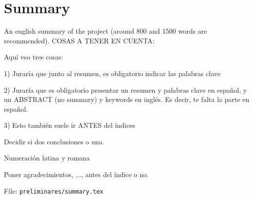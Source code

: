 %

\chapter{Summary}

An english summary of the project (around 800 and 1500 words are recommended).
COSAS A TENER EN CUENTA: 

Aquí veo tres cosas:

1) Juraría que junto al resumen, es obligatorio indicar las palabras clave

2) Juraría que es obligatorio presentar un resumen y palabras clave en español, y un ABSTRACT (no summary) y keywords en inglés. Es decir, te falta la parte en español.

3) Esto también suele ir ANTES del índices

Decidir si dos conclusiones o una.

Numeración latina y romana

Poner agradecimientos, ...,  antes del índice o no.

File: \texttt{preliminares/summary.tex}


\endinput
